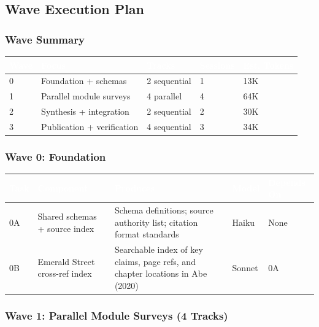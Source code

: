 \documentclass[11pt,letterpaper]{article}
\newcommand{\tableheader}[1]{\textbf{\sffamily\textcolor{white}{#1}}}
\begin{document}
\subsection{Wave Execution Plan}

\subsubsection{Wave Summary}

\begin{center}
\begin{tabularx}{\textwidth}{C{1.2cm}L{3cm}C{2cm}C{1.5cm}C{1.5cm}}
\toprule
{}
\tableheader{Wave} & \tableheader{Focus} & \tableheader{Tracks} & \tableheader{Sessions} & \tableheader{Est. Tokens} \\
 & Foundation + schemas & 2 sequential & 1 & 13K \\
1 & Parallel module surveys & 4 parallel & 4 & 64K \\
2 & Synthesis + integration & 2 sequential & 2 & 30K \\
3 & Publication + verification & 4 sequential & 3 & 34K \\
\bottomrule
\end{tabularx}
\end{center}

\subsubsection{Wave 0: Foundation}

\begin{center}
\begin{tabularx}{\textwidth}{L{0.8cm}L{3cm}XC{1.8cm}C{2cm}}
\toprule
{}
\tableheader{Task} & \tableheader{Component} & \tableheader{Produces} & \tableheader{Model} & \tableheader{Depends On} \\
\midrule
0A & Shared schemas + source index & Schema definitions; source authority list; citation format standards & Haiku & None \\
0B & Emerald Street cross-ref index & Searchable index of key claims, page refs, and chapter locations in Abe (2020) & Sonnet & 0A \\
\bottomrule
\end{tabularx}
\end{center}

\subsubsection{Wave 1: Parallel Module Surveys (4 Tracks)}
\end{document}
